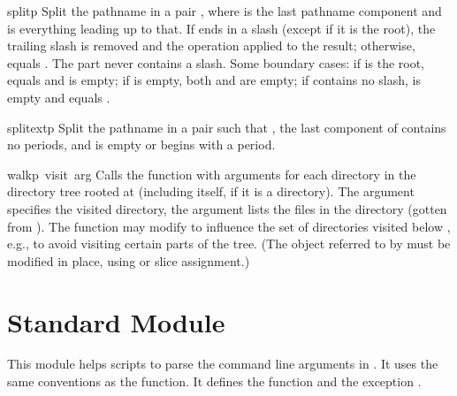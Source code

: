 \begin{funcdesc}{split}{p}
Split the pathname  in a pair , where
 is the last pathname component and  is
everything leading up to that.  If  ends in a slash (except if
it is the root), the trailing slash is removed and the operation
applied to the result; otherwise,  equals
.  The  part never contains a slash.  Some boundary
cases: if  is the root,  equals  and
 is empty; if  is empty, both  and
 are empty; if  contains no slash,  is
empty and  equals .
\end{funcdesc}

\begin{funcdesc}{splitext}{p}
Split the pathname  in a pair 
such that ,
the last component of  contains no periods,
and  is empty or begins with a period.
\end{funcdesc}

\begin{funcdesc}{walk}{p\, visit\, arg}
Calls the function  with arguments
 for each directory in the
directory tree rooted at  (including  itself, if it is a
directory).  The argument  specifies the visited directory,
the argument  lists the files in the directory (gotten from
).  The  function may
modify  to influence the set of directories visited below
, e.g., to avoid visiting certain parts of the tree.  (The
object referred to by  must be modified in place, using
 or slice assignment.)
\end{funcdesc}

\section{Standard Module }

This module helps scripts to parse the command line arguments in
.
It uses the same conventions as the \UNIX{}
function.
It defines the function
and the exception
.

